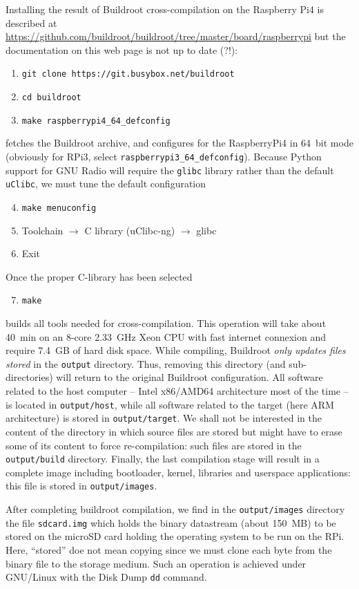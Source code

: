 \documentclass[a4paper]{article}
\begin{document}
Installing the result of Buildroot cross-compilation on the Raspberry Pi4 is 
described at \url{https://github.com/buildroot/buildroot/tree/master/board/raspberrypi} but
the documentation on this web page is not up to date (?!):
\begin{enumerate}
\item {\tt git clone https://git.busybox.net/buildroot}
\item {\tt cd buildroot}
\item {\tt make raspberrypi4\_64\_defconfig}
\end{enumerate}
fetches the Buildroot archive, and configures for the RaspberryPi4 in 64~bit mode (obviously
for RPi3, select {\tt raspberrypi3\_64\_defconfig}).
Because Python support for GNU Radio will require the {\tt glibc} library rather than the default
{\tt uClibc}, we must tune the default configuration
\begin{enumerate}
\setcounter{enumi}{3}
\item {\tt make menuconfig}
\item Toolchain $\rightarrow$ C library (uClibc-ng) $\rightarrow$ glibc
\item Exit
\end{enumerate}

Once the proper C-library has been selected
\begin{enumerate}
\setcounter{enumi}{6}
\item {\tt make}
\end{enumerate}
builds all tools
needed for cross-compilation. This operation will take about 40~min on an 8-core 2.33~GHz Xeon 
CPU with fast internet connexion and require 7.4~GB of hard disk space. While compiling, 
Buildroot {\em only updates files stored} in the 
{\tt output} directory. Thus, removing this directory (and sub-directories) will return to
the original Buildroot configuration. All software related to the host computer -- Intel x86/AMD64
architecture most of the time -- is located in {\tt output/host}, while all software related
to the target (here ARM architecture) is stored in {\tt output/target}. We shall not be
interested in the content of the directory in which source files are stored but might have
to erase some of its content to force re-compilation: such files are stored in the {\tt output/build}
directory. Finally, the last compilation stage will result in a complete image including bootloader,
kernel, libraries and userspace applications: this file is stored in {\tt output/images}.

After completing buildroot compilation, we find in the {\tt output/images} directory 
the file {\tt sdcard.img} which 
holds the binary datastream (about 150~MB) to be stored on the microSD card holding the 
operating system to 
be run on the RPi. Here, ``stored'' doe not mean copying since we must clone each byte from 
the binary file to the storage medium. Such an operation is achieved under GNU/Linux with the
Disk Dump {\tt dd} command.
\end{document}
